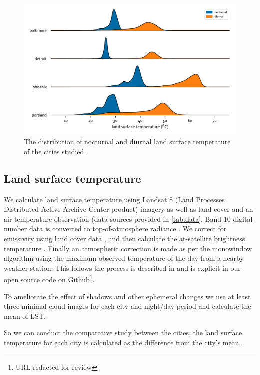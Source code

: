 \documentclass[final,3p,times,twocolumn,sort&compress]{elsarticle}
\begin{document}
\begin{figure}
    \centering
    \includegraphics[width=\linewidth]{fig/report/joyplot_lst_500.pdf}
    \caption{The distribution of nocturnal and diurnal land surface temperature of the cities studied.}
    \label{fig:joy}
\end{figure}

\subsection{Land surface temperature}
We calculate land surface temperature using Landsat 8 (Land Processes Distributed Active Archive Center product) imagery as well as land cover and an air temperature observation (data sources provided in \ref{tab:data}. Band-10 digital-number data is converted to top-of-atmosphere radiance \cite{Jimenez-Munoz2003-wc}. We correct for emissivity using land cover data \cite{Alipour2003-gb}, and then calculate the at-satellite brightness temperature \cite{Jimenez-Munoz2003-wc}. Finally an atmospheric correction is made as per the monowindow algorithm \cite{Qin2001-jn} using the maximum observed temperature of the day from a nearby weather station. This follows the process is described in \cite{Scott2016-lc} and is explicit in our open source code on Github\footnote{URL redacted for review}. 

To ameliorate the effect of shadows and other ephemeral changes \cite{Zhou2018-iy} we use at least three minimal-cloud images for each city and night/day period and calculate the mean of LST.

So we can conduct the comparative study between the cities, the land surface temperature for each city is calculated as the difference from the city's mean. 
\end{document}
